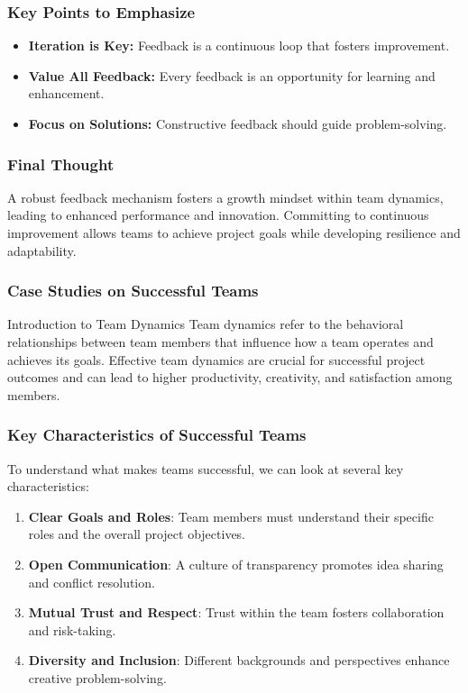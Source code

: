 \documentclass[aspectratio=169]{beamer}
\begin{document}
\begin{frame}[fragile]
    \frametitle{Key Points to Emphasize}
    \begin{itemize}
        \item \textbf{Iteration is Key:} Feedback is a continuous loop that fosters improvement.
        \item \textbf{Value All Feedback:} Every feedback is an opportunity for learning and enhancement.
        \item \textbf{Focus on Solutions:} Constructive feedback should guide problem-solving.
    \end{itemize}
\end{frame}

\begin{frame}[fragile]
    \frametitle{Final Thought}
    A robust feedback mechanism fosters a growth mindset within team dynamics, leading to enhanced performance and innovation. Committing to continuous improvement allows teams to achieve project goals while developing resilience and adaptability.
\end{frame}

\begin{frame}[fragile]
    \frametitle{Case Studies on Successful Teams}
    \begin{block}{Introduction to Team Dynamics}
        Team dynamics refer to the behavioral relationships between team members that influence how a team operates and achieves its goals. Effective team dynamics are crucial for successful project outcomes and can lead to higher productivity, creativity, and satisfaction among members.
    \end{block}
\end{frame}

\begin{frame}[fragile]
    \frametitle{Key Characteristics of Successful Teams}
    To understand what makes teams successful, we can look at several key characteristics:
    \begin{enumerate}
        \item \textbf{Clear Goals and Roles}: Team members must understand their specific roles and the overall project objectives.
        \item \textbf{Open Communication}: A culture of transparency promotes idea sharing and conflict resolution.
        \item \textbf{Mutual Trust and Respect}: Trust within the team fosters collaboration and risk-taking.
        \item \textbf{Diversity and Inclusion}: Different backgrounds and perspectives enhance creative problem-solving.
    \end{enumerate}
\end{frame}
\end{document}
